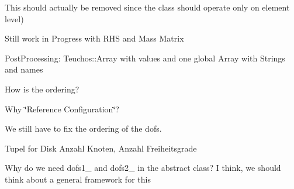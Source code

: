 
\begin{DoxyRefList}
\item[\label{todo__todo000001}%
\Hypertarget{todo__todo000001}%
Class \hyperlink{classFEDD_1_1AssembleFE}{F\+E\+DD\+:\+:Assemble\+FE$<$ SC, LO, GO, NO $>$} ]This should actually be removed since the class should operate only on element level)  
\item[\label{todo__todo000005}%
\Hypertarget{todo__todo000005}%
Member \hyperlink{classFEDD_1_1AssembleFE_a9eea5124c4b385c2807ad8b20614d050}{F\+E\+DD\+:\+:Assemble\+FE$<$ SC, LO, GO, NO $>$\+:\+:add\+R\+H\+S\+Func} (Rhs\+Func\+\_\+\+Type rhs\+Func)]Still work in Progress with R\+HS and Mass Matrix  
\item[\label{todo__todo000003}%
\Hypertarget{todo__todo000003}%
Member \hyperlink{classFEDD_1_1AssembleFE_a35ada89164c74b433340733c01f30f4b}{F\+E\+DD\+:\+:Assemble\+FE$<$ SC, LO, GO, NO $>$\+:\+:get\+Dim} ()]Post\+Processing\+: Teuchos\+::\+Array with values and one global Array with Strings and names  
\item[\label{todo__todo000004}%
\Hypertarget{todo__todo000004}%
Member \hyperlink{classFEDD_1_1AssembleFE_a93f37b5e5f8f9a73152abb2e8be4ba4f}{F\+E\+DD\+:\+:Assemble\+FE$<$ SC, LO, GO, NO $>$\+:\+:get\+Nodes\+Ref\+Config} ()]How is the ordering?  
\item[\label{todo__todo000006}%
\Hypertarget{todo__todo000006}%
Member \hyperlink{classFEDD_1_1AssembleFE_ab2892bff598d5a4f784d4f30ddf4836c}{F\+E\+DD\+:\+:Assemble\+FE$<$ SC, LO, GO, NO $>$\+:\+:nodes\+Ref\+Config\+\_\+} ]Why \char`\"{}\+Reference Configuration\char`\"{}?  
\item[\label{todo__todo000002}%
\Hypertarget{todo__todo000002}%
Member \hyperlink{classFEDD_1_1AssembleFE_a5303adf0752fe27d9ff47ae8a39c1da4}{F\+E\+DD\+:\+:Assemble\+FE$<$ SC, LO, GO, NO $>$\+:\+:update\+Solution} (vec\+\_\+dbl\+\_\+\+Type solution)]We still have to fix the ordering of the dofs.  
\item[\label{todo__todo000007}%
\Hypertarget{todo__todo000007}%
Member \hyperlink{classFEDD_1_1AssembleFEAceLaplace_a0899c869aa01d6a2730b2d5c6d70af22}{F\+E\+DD\+:\+:Assemble\+F\+E\+Ace\+Laplace$<$ SC, LO, GO, NO $>$\+:\+:assembly\+Laplacian} (Small\+Matrix\+Ptr\+\_\+\+Type \&element\+Matrix)]Tupel for Disk Anzahl Knoten, Anzahl Freiheitsgrade  
\item[\label{todo__todo000008}%
\Hypertarget{todo__todo000008}%
Member \hyperlink{classFEDD_1_1AssembleFEAceNavierStokes_ab9f645b7c95c753306f55b0719c320c4}{F\+E\+DD\+:\+:Assemble\+F\+E\+Ace\+Navier\+Stokes$<$ SC, LO, GO, NO $>$\+:\+:dofs\+Velocity\+\_\+} ]Why do we need dofs1\+\_\+ and dofs2\+\_\+ in the abstract class? I think, we should think about a general framework for this 


\end{DoxyRefList}
